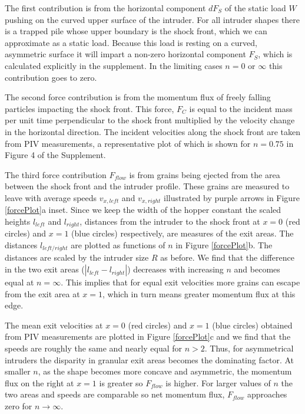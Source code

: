 The first contribution is from the horizontal component $dF_{S}$ of the static load $W$ pushing on the curved upper surface of the intruder. For all intruder shapes there is a trapped pile whose upper boundary is the shock front, which we can approximate as a static load.  Because this load is resting on a curved, asymmetric surface it will impart a non-zero horizontal component $F_{S}$, which is calculated explicitly in the supplement. In the limiting cases $n=0$ or $\infty$ this contribution goes to zero.

The second force contribution is from the momentum flux of freely falling particles impacting the shock front. This force, $F_{C}$ is equal to the incident mass per unit time perpendicular to the shock front multiplied by the velocity change in the horizontal direction. The incident velocities along the shock front are taken from PIV measurements, a representative plot of which is shown for $n=0.75$ in Figure 4 of the Supplement.

The third force contribution $F_{flow}$ is from grains being ejected from the area between the shock front and the intruder profile.  These grains are measured to leave with average speeds $v_{x,left}$ and $v_{x,right}$ illustrated by purple arrows in Figure \ref{forcePlot}a inset. Since we keep the width of the hopper constant the scaled heights $l_{left}$ and $l_{right}$, distances from the intruder to the shock front at $x=0$ (red circles) and $x=1$ (blue circles) respectively, are measures of the exit areas. The distances $l_{left/right}$ are plotted as functions of $n$ in Figure \ref{forcePlot}b. The distances are scaled by the intruder size $R$ as before. We find that the difference in the two exit areas ($|l_{left}-l_{right}|$) decreases with increasing $n$ and becomes equal at $n=\infty$. This implies that for equal exit velocities more grains can escape from the exit area at $x=1$, which in turn means greater momentum flux at this edge.   

The mean exit velocities at $x=0$ (red circles) and $x=1$ (blue circles) obtained from PIV measurements are plotted in Figure \ref{forcePlot}c and we find that the speeds are roughly the same and nearly equal for $n>2$.  Thus, for asymmetrical intruders the disparity in granular exit areas becomes the dominating factor.  At smaller $n$, as the shape becomes more concave and asymmetric, the momentum flux on the right at $x=1$ is greater so $F_{flow}$ is higher. For larger values of $n$ the two areas and speeds are comparable so net momentum flux, $F_{flow}$ approaches zero for $n\rightarrow\infty$. 

